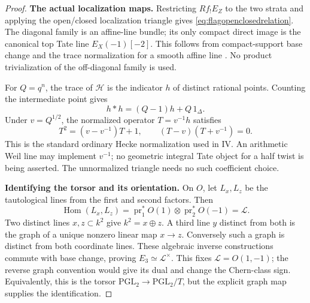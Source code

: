 \begin{proof}
\par\smallskip\noindent\textbf{The actual localization maps.}\quad
Restricting \(Rf_!E_Z\) to the two strata and applying the
open/closed localization triangle gives
\eqref{eq:flagopenclosedrelation}.
The diagonal family is an affine-line bundle; its only compact
direct image is the canonical top Tate line
\(E_X(-1)[-2]\).
This follows from compact-support base change and the trace
normalization for a smooth affine line
\cite[Proposition~18.4(b), pp.~121--122; Theorem~24.1(a),(b),
p.~144]{Milne}.
No product trivialization of the off-diagonal family is used.

For \(Q=q^n\), the trace of \(\mathcal H\) is the indicator
\(h\) of distinct rational points. Counting the intermediate
point gives
\begin{equation}\label{eq:unnormalizedflagHecke}
                         h*h=(Q-1)h+Q\,1_\Delta.
\end{equation}
Under \(v=Q^{1/2}\), the normalized operator \(T=v^{-1}h\)
satisfies
\[
 T^2=(v-v^{-1})T+1,\qquad (T-v)(T+v^{-1})=0.
\]
This is the standard ordinary Hecke normalization used in IV.
An arithmetic Weil line may implement \(v^{-1}\); no geometric
integral Tate object for a half twist is being asserted.
The unnormalized triangle needs no such coefficient choice.

\par\smallskip\noindent\textbf{Identifying the torsor and its orientation.}\quad
On \(O\), let \(L_x,L_z\) be the tautological lines from the
first and second factors. Then
\[
 \operatorname{Hom}(L_x,L_z)
      =\operatorname{pr}_1^*O(1)\otimes
        \operatorname{pr}_2^*O(-1)=\mathcal L.
\]
Two distinct lines \(x,z\subset k^2\) give \(k^2=x\oplus z\).
A third line \(y\) distinct from both is the graph of a unique
nonzero linear map \(x\to z\). Conversely such a graph is
distinct from both coordinate lines. These algebraic inverse
constructions commute with base change, proving
\(E_3\simeq\mathcal L^\times\).
This fixes \(\mathcal L=O(1,-1)\); the reverse graph convention
would give its dual and change the Chern-class sign.
Equivalently, this is the torsor
\(\mathrm{PGL}_2\to\mathrm{PGL}_2/T\), but the explicit graph
map supplies the identification.


\end{proof}
